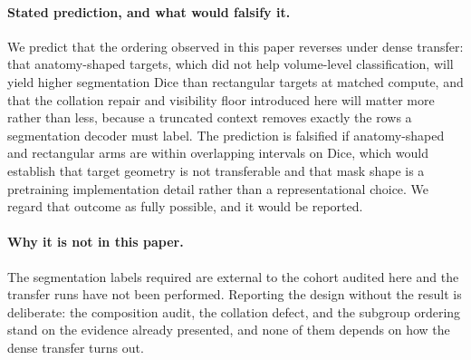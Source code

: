 \documentclass{article}
\begin{document}
\paragraph{Stated prediction, and what would falsify it.}
We predict that the ordering observed in this paper reverses under dense
transfer: that anatomy-shaped targets, which did not help volume-level
classification, will yield higher segmentation Dice than rectangular targets at
matched compute, and that the collation repair and visibility floor introduced
here will matter more rather than less, because a truncated context removes
exactly the rows a segmentation decoder must label. The prediction is falsified
if anatomy-shaped and rectangular arms are within overlapping intervals on
Dice, which would establish that target geometry is not transferable and that
mask shape is a pretraining implementation detail rather than a
representational choice. We regard that outcome as fully possible, and it would
be reported.

\paragraph{Why it is not in this paper.}
The segmentation labels required are external to the cohort audited here and
the transfer runs have not been performed. Reporting the design without the
result is deliberate: the composition audit, the collation defect, and the
subgroup ordering stand on the evidence already presented, and none of them
depends on how the dense transfer turns out.
\end{document}
